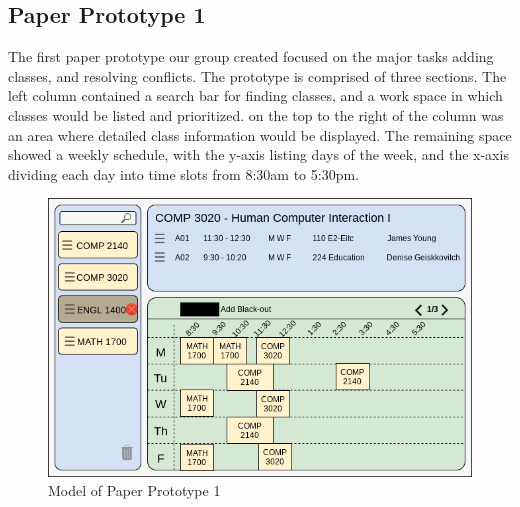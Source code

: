 \documentclass{article}
\begin{document}
\subsection{Paper Prototype 1}%
The first paper prototype our group created focused on the major tasks adding classes, and resolving conflicts. The prototype is comprised of three sections. The left column contained a search bar for finding classes, and a work space in which classes would be listed and prioritized. on the top to the right of the column was an area where detailed class information would be displayed. The remaining space showed a weekly schedule, with the y-axis listing days of the week, and the x-axis dividing each day into time slots from 8:30am to 5:30pm.
\begin{figure}[h]
	    \centering
	    \caption{Model of Paper Prototype 1}
	    \includegraphics[width=15cm]{paperprototype1.png}
	\end{figure}
	
\end{document}
